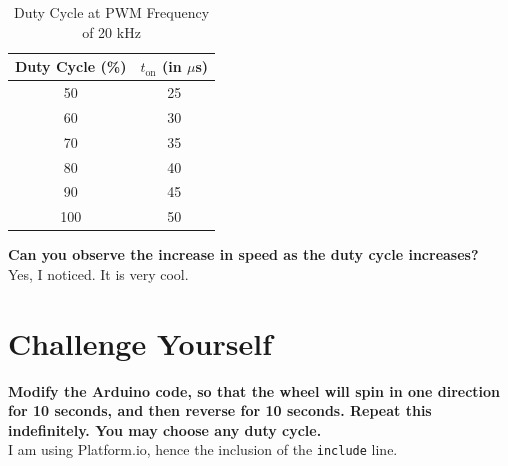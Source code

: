 \documentclass[a4paper,12pt,oneside, tikz]{book}
\begin{document}
\begin{table}[H]
    \centering
    \begin{tabular}{|c|c|}
        \hline Duty Cycle (\%) & $t_\text{on}$ (in $\mu$s) \\
        \hline 50 & 25 \\
         60 & 30 \\
         70 & 35 \\
         80 & 40 \\
         90 & 45 \\
         100 & 50 \\
         \hline
    \end{tabular}
    \caption{Duty Cycle at PWM Frequency of 20 kHz}
    \label{tab:duties}
\end{table}

\begin{tcolorbox}
\textbf{Can you observe the increase in speed as the duty cycle increases?}\\
Yes, I noticed. It is very cool.
\end{tcolorbox}
\chapter{Challenge Yourself}

\textbf{Modify the Arduino code, so that the wheel will spin in one direction for 10 seconds, and then reverse for 10 seconds. Repeat this indefinitely. You may choose any duty cycle.} \\

I am using Platform.io, hence the inclusion of the \texttt{include} line.
\end{document}

